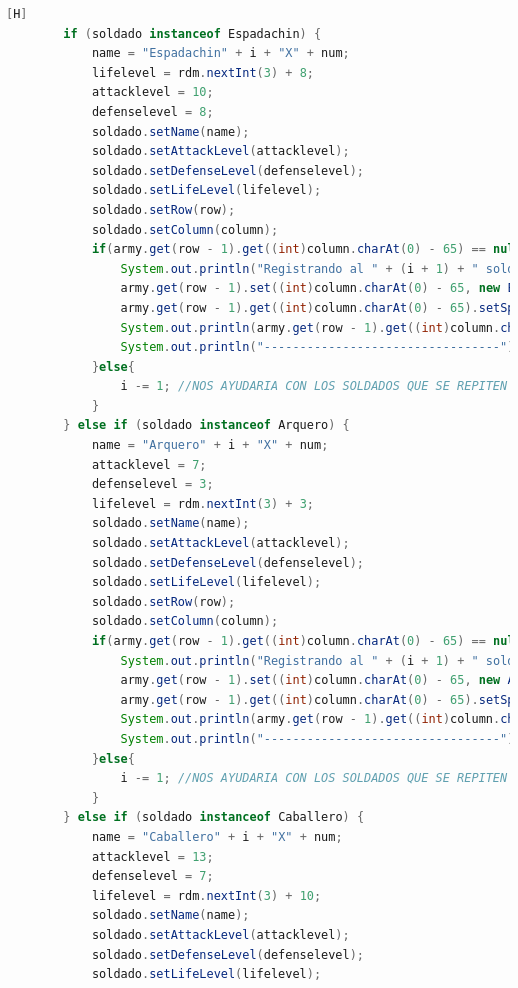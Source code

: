 \documentclass{article}
\begin{document}
	\begin{lstlisting}[language=java,caption={Las lineas de codigos de la clase Mapa creada:}][H]
		if (soldado instanceof Espadachin) {
			name = "Espadachin" + i + "X" + num; 
			lifelevel = rdm.nextInt(3) + 8; 
			attacklevel = 10;
			defenselevel = 8;
			soldado.setName(name);                  
			soldado.setAttackLevel(attacklevel);
			soldado.setDefenseLevel(defenselevel);                    
			soldado.setLifeLevel(lifelevel);
			soldado.setRow(row);
			soldado.setColumn(column);
			if(army.get(row - 1).get((int)column.charAt(0) - 65) == null){
				System.out.println("Registrando al " + (i + 1) + " soldado del Ejercito " + armyespe + "");
				army.get(row - 1).set((int)column.charAt(0) - 65, new Espadachin(name, attacklevel, defenselevel, lifelevel, speed, "Espadachin", true, row, column, attacklevel));
				army.get(row - 1).get((int)column.charAt(0) - 65).setSpeed(speed);
				System.out.println(army.get(row - 1).get((int)column.charAt(0) - 65).toString());
				System.out.println("---------------------------------");
			}else{
				i -= 1; //NOS AYUDARIA CON LOS SOLDADOS QUE SE REPITEN EN EL MISMO CASILLERO CON TAL QUE NO DEBERIA CONTAR 
			}
		} else if (soldado instanceof Arquero) {
			name = "Arquero" + i + "X" + num; 
			attacklevel = 7;
			defenselevel = 3;
			lifelevel = rdm.nextInt(3) + 3; 
			soldado.setName(name);                  
			soldado.setAttackLevel(attacklevel);
			soldado.setDefenseLevel(defenselevel);                    
			soldado.setLifeLevel(lifelevel);
			soldado.setRow(row);
			soldado.setColumn(column);
			if(army.get(row - 1).get((int)column.charAt(0) - 65) == null){
				System.out.println("Registrando al " + (i + 1) + " soldado del Ejercito " + armyespe + "");
				army.get(row - 1).set((int)column.charAt(0) - 65, new Arquero(name, attacklevel, defenselevel, lifelevel, speed, "Arquero", true, row, column, attacklevel));
				army.get(row - 1).get((int)column.charAt(0) - 65).setSpeed(speed);
				System.out.println(army.get(row - 1).get((int)column.charAt(0) - 65).toString());
				System.out.println("---------------------------------");
			}else{
				i -= 1; //NOS AYUDARIA CON LOS SOLDADOS QUE SE REPITEN EN EL MISMO CASILLERO CON TAL QUE NO DEBERIA CONTAR 
			}
		} else if (soldado instanceof Caballero) {
			name = "Caballero" + i + "X" + num; 
			attacklevel = 13;
			defenselevel = 7;
			lifelevel = rdm.nextInt(3) + 10; 
			soldado.setName(name);                  
			soldado.setAttackLevel(attacklevel);
			soldado.setDefenseLevel(defenselevel);                    
			soldado.setLifeLevel(lifelevel);

\end{lstlisting}
\end{document}
